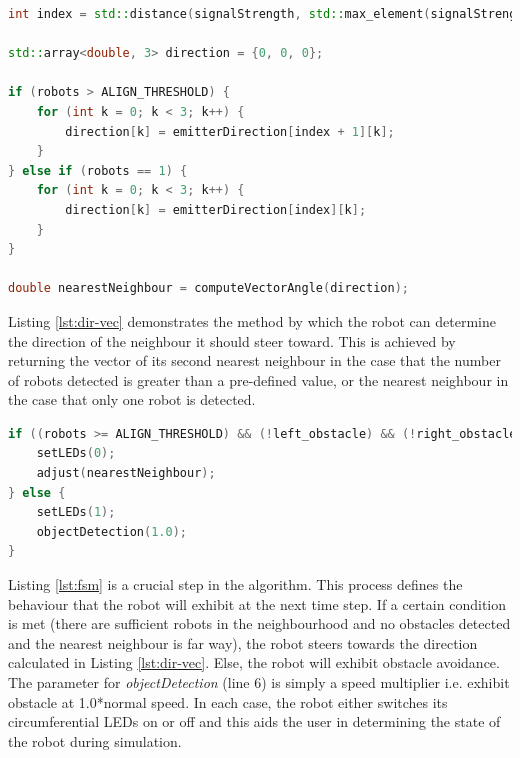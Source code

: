 \begin{lstlisting}[language=C++, caption={Calculating target vector},label={lst:dir-vec}]
int index = std::distance(signalStrength, std::max_element(signalStrength, signalStrength + sizeof(signalStrength) / sizeof(double)));

std::array<double, 3> direction = {0, 0, 0};

if (robots > ALIGN_THRESHOLD) {
	for (int k = 0; k < 3; k++) {
		direction[k] = emitterDirection[index + 1][k];
	}
} else if (robots == 1) {
	for (int k = 0; k < 3; k++) {
		direction[k] = emitterDirection[index][k];
	}
}

double nearestNeighbour = computeVectorAngle(direction);
\end{lstlisting}

Listing \ref{lst:dir-vec} demonstrates the method by which the robot can determine the direction of the neighbour it should steer toward. This is achieved by returning the vector of its second nearest neighbour in the case that the number of robots detected is greater than a pre-defined value, or the nearest neighbour in the case that only one robot is detected.

\begin{lstlisting}[language=C++, caption={Action for next step},label={lst:fsm}]
if ((robots >= ALIGN_THRESHOLD) && (!left_obstacle) && (!right_obstacle) && signalStrength[index] < 10) {
	setLEDs(0);
	adjust(nearestNeighbour);
} else {
	setLEDs(1);
	objectDetection(1.0);
}
\end{lstlisting}

Listing \ref{lst:fsm} is a crucial step in the algorithm. This process defines the behaviour that the robot will exhibit at the next time step. If a certain condition is met (there are sufficient robots in the neighbourhood and no obstacles detected and the nearest neighbour is far way), the robot steers towards the direction calculated in Listing \ref{lst:dir-vec}. Else, the robot will exhibit obstacle avoidance. The parameter for \textit{objectDetection} (line 6) is simply a speed multiplier i.e. exhibit obstacle at 1.0*normal speed. In each case, the robot either switches its circumferential LEDs on or off and this aids the user in determining the state of the robot during simulation.

